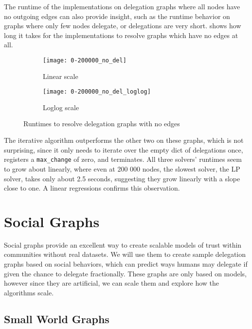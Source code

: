 The runtime of the implementations on delegation graphs where all nodes have no outgoing edges can also provide insight, such as the runtime behavior on graphs where only few nodes delegate, or delegations are very short.  shows how long it takes for the implementations to resolve graphs which have no edges at all. 

\begin{figure}[t]
    \centering
    \begin{subfigure}[t]{0.45\textwidth}
    	\centering
    	\texttt{[image: 0-200000\_no\_del]}
    	\caption{Linear scale}
    	\label{subfig:no-del-linear}
    \end{subfigure}
    \hfill
    \begin{subfigure}[t]{0.45\textwidth}
        \centering
        \texttt{[image: 0-200000\_no\_del\_loglog]}
        \caption{Loglog scale}
         \label{subfig:no-del-loglog}
    \end{subfigure}
    \caption{Runtimes to resolve delegation graphs with no edges}
    \label{fig:no_del}
\end{figure}


The iterative algorithm outperforms the other two on these graphs, which is not surprising, since it only needs to iterate over the empty dict of delegations once, registers a \texttt{max\_change} of zero, and terminates. All three solvers' runtimes seem to grow about linearly, where even at 200 000 nodes, the slowest solver, the LP solver, takes only about 2.5 seconds, suggesting they grow linearly with a slope close to one. A linear regressions confirms this observation. 

\section{Social Graphs}
\label{sec:social_graphs}

Social graphs provide an excellent way to create scalable models of trust within communities without real datasets. We will use them to create sample delegation graphs based on social behaviors, which can predict ways humans may delegate if given the chance to delegate fractionally. These graphs are only based on models, however since they are artificial, we can scale them and explore how the algorithms scale.

\subsection{Small World Graphs}

